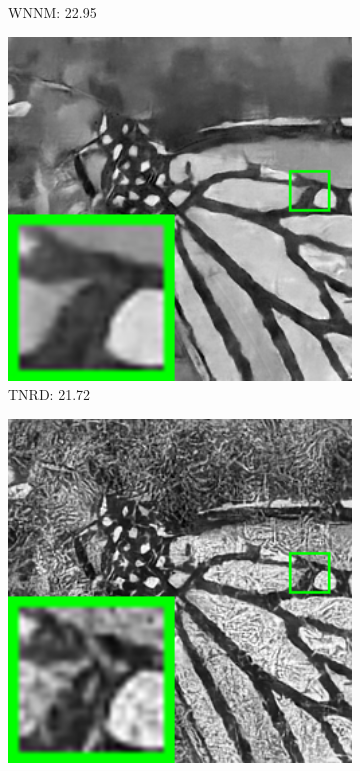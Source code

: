 \begin{figure}
\begin{adjustwidth}{-2cm}{}
\begin{subfigure}[t]{0.19\textwidth}
		\caption{WNNM: 22.95}
    \end{subfigure}
    \hfill
    \begin{subfigure}[t]{0.19\textwidth}
        \centering
        \includegraphics[width=1\textwidth]{images/twsc/awgn/br_TNRD_100_monarch.png}
		\caption{TNRD: 21.72}
    \end{subfigure}
    \hfill
    \begin{subfigure}[t]{0.19\textwidth}
        \centering
        \includegraphics[width=1\textwidth]{images/twsc/awgn/br_DnCNN_100_monarch.png}

\end{subfigure}
\end{adjustwidth}
\end{figure}
